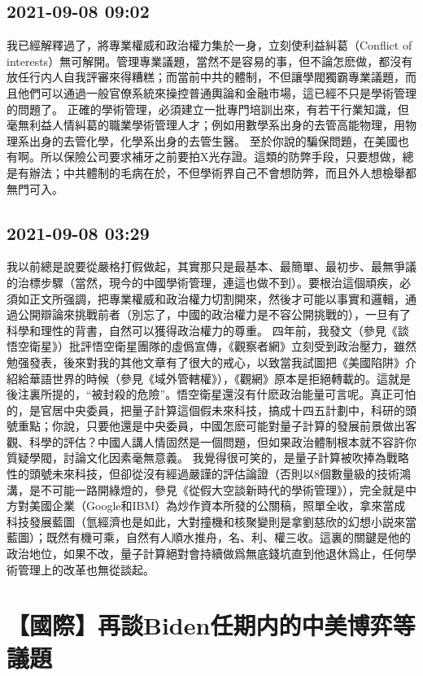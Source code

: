 \documentclass[twocolumn]{ctexart}
\begin{document}
\subsection*{2021-09-08 09:02}

我已經解釋過了，將專業權威和政治權力集於一身，立刻使利益糾葛（Conflict of interests）無可解開。管理專業議題，當然不是容易的事，但不論怎麽做，都沒有放任行内人自我評審來得糟糕；而當前中共的體制，不但讓學閥獨霸專業議題，而且他們可以通過一般官僚系統來操控普通輿論和金融市場，這已經不只是學術管理的問題了。
正確的學術管理，必須建立一批專門培訓出來，有若干行業知識，但毫無利益人情糾葛的職業學術管理人才；例如用數學系出身的去管高能物理，用物理系出身的去管化學，化學系出身的去管生醫。
至於你說的騙保問題，在美國也有啊。所以保險公司要求補牙之前要拍X光存證。這類的防弊手段，只要想做，總是有辦法；中共體制的毛病在於，不但學術界自己不會想防弊，而且外人想檢舉都無門可入。
\subsection*{2021-09-08 03:29}

我以前總是說要從嚴格打假做起，其實那只是最基本、最簡單、最初步、最無爭議的治標步驟（當然，現今的中國學術管理，連這也做不到）。要根治這個頑疾，必須如正文所强調，把專業權威和政治權力切割開來，然後才可能以事實和邏輯，通過公開辯論來挑戰前者（別忘了，中國的政治權力是不容公開挑戰的），一旦有了科學和理性的背書，自然可以獲得政治權力的尊重。
四年前，我發文（參見《談悟空衛星》）批評悟空衛星團隊的虛僞宣傳，《觀察者網》立刻受到政治壓力，雖然勉强發表，後來對我的其他文章有了很大的戒心，以致當我試圖把《美國陷阱》介紹給華語世界的時候（參見《域外管轄權》），《觀網》原本是拒絕轉載的。這就是後注裏所提的，“被封殺的危險”。悟空衛星還沒有什麽政治能量可言呢。真正可怕的，是官居中央委員，把量子計算這個假未來科技，搞成十四五計劃中，科研的頭號重點；你說，只要他還是中央委員，中國怎麽可能對量子計算的發展前景做出客觀、科學的評估？中國人講人情固然是一個問題，但如果政治體制根本就不容許你質疑學閥，討論文化因素毫無意義。
我覺得很可笑的，是量子計算被吹捧為戰略性的頭號未來科技，但卻從沒有經過嚴謹的評估論證（否則以8個數量級的技術鴻溝，是不可能一路開綠燈的，參見《從假大空談新時代的學術管理》），完全就是中方對美國企業（Google和IBM）為炒作資本所發的公關稿，照單全收，拿來當成科技發展藍圖（氫經濟也是如此，大對撞機和核聚變則是拿劉慈欣的幻想小説來當藍圖）；既然有機可乘，自然有人順水推舟，名、利、權三收。這裏的關鍵是他的政治地位，如果不改，量子計算絕對會持續做爲無底錢坑直到他退休爲止，任何學術管理上的改革也無從談起。
\section*{【國際】再談Biden任期内的中美博弈等議題}
\end{document}
